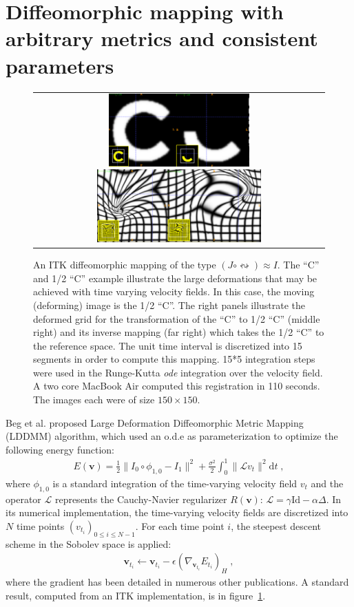 \documentclass{llncs}
\newcommand{\vect}[1]{\mathbf{#1}}
\renewcommand{\v}{\vect{v}}
\newcommand{\myphi}{\phi}
\renewcommand{\d}{\nabla}
\newcommand{\dd}{\text{d}}
\renewcommand{\L}{\Delta} %
\newcommand{\myR}{R}
\newcommand{\myE}{E}
\newcommand{\Id}{\text{Id}}
\newcommand{\opL}{\mathcal{L}}
\begin{document}
\section{Diffeomorphic mapping with arbitrary metrics and consistent parameters}
\begin{figure}[t]
\begin{center}
\begin{tabular}{c}
\includegraphics[height=1.1in]{figs/c_chalf.pdf}
\includegraphics[height=1.1in]{figs/c_half_c_grids.pdf}
\end{tabular}
\caption{\baselineskip 12pt \small An ITK diffeomorphic mapping of the
  type $(J \circ \leftrightsquigarrow) \approx I$.  The 
``C'' and 1/2 ``C'' example illustrate the large deformations that may
be achieved with time varying velocity fields.  In this case, the moving (deforming) image is
the 1/2 ``C''.  The right panels illustrate the deformed grid for the
transformation of the ``C'' to 1/2 ``C'' (middle right) and its
inverse mapping (far right) which takes the 1/2 ``C'' to the reference
space.  The unit time interval is discretized into 15 segments in
order to compute this mapping.  15*5 integration steps were used in
the Runge-Kutta {\em ode} integration over the velocity field.  A two
core MacBook Air computed this registration in 110 seconds.  The images
each were of size $150 \times 150$.}
\label{fig:chalf}
\end{center}
\end{figure}

Beg et al. proposed Large Deformation Diffeomorphic Metric Mapping (LDDMM) algorithm, which used an o.d.e as parameterization to optimize the following energy function:
\begin{align}
\myE(\v) = \frac{1}{2} \| I_0 \circ \myphi_{1,0} - I_1 \|^2 
+ 
\frac{\sigma^2}{2}\int_{0}^{1} \| \opL v_t\|^2 \dd t \;,
\label{eq:lddmm}
\end{align}
where $\myphi_{1,0}$ is a standard integration of the time-varying
velocity field $v_t$ and the operator $\opL$ represents the
Cauchy-Navier regularizer $\myR(\v)$: $\opL = \gamma \Id - \alpha \L$.
In its numerical implementation, the time-varying velocity fields are discretized into $N$ time points $(v_{t_i} )_{0 \leq i \leq N-1}$. For each time point $i$, the steepest descent scheme in the Sobolev space is applied:
\begin{align}
\v_{t_i}  \leftarrow \v_{t_i} - \epsilon (\d_{\v_{t_i}} \myE_{t_i})_H \; ,
\end{align}
where the gradient has been detailed in numerous other publications.
A standard result, computed from an ITK implementation, is in figure~\ref{fig:chalf}.
\end{document}
